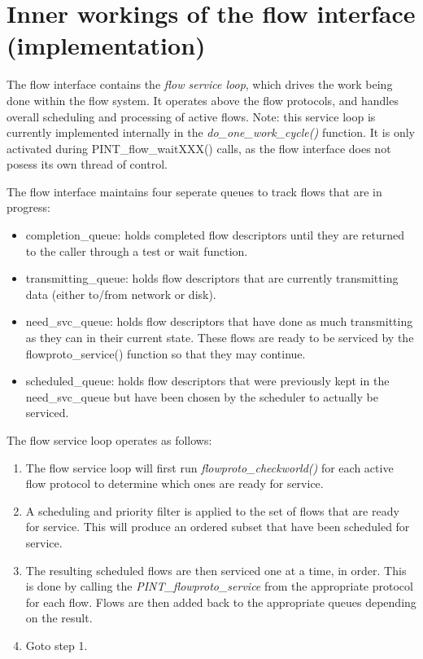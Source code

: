 \documentclass[12pt]{article} %
\begin{document}
\section{Inner workings of the flow interface (implementation)}

The flow interface contains the \emph{flow service loop}, which drives
the work being done within the flow system.  It operates above the flow
protocols, and handles overall scheduling and processing of active flows.
Note: this service loop is currently implemented internally in the
\emph{do\_one\_work\_cycle()} function.  It is only activated
during PINT\_flow\_waitXXX() calls, as the flow interface does not
posess its own thread of control.

The flow interface maintains four seperate queues to track flows
that are in progress:

\begin{itemize}
\item completion\_queue: holds completed flow descriptors until
they are returned to the caller through a test or wait function.
\item transmitting\_queue: holds flow descriptors that are
currently transmitting data (either to/from network or disk).
\item need\_svc\_queue: holds flow descriptors that have done as
much transmitting as they can in their current state.  These flows
are ready to be serviced by the flowproto\_service() function so
that they may continue.
\item scheduled\_queue: holds flow descriptors that were
previously kept in the need\_svc\_queue but have been chosen by
the scheduler to actually be serviced.
\end{itemize}

The flow service loop operates as follows:

\begin{enumerate}
	\item The flow service loop will first run
	\emph{flowproto\_checkworld()} for each active flow protocol to
	determine which ones are ready for service.
	\item A scheduling and priority filter is applied to the set of flows
	that are ready for service.  This will produce an ordered subset that
	have been scheduled for service.
	\item The resulting scheduled flows are then serviced one at a time, in
	order.  This is done by calling the \emph{PINT\_flowproto\_service}
	from the appropriate protocol for each flow.  Flows are then
	added back to the appropriate queues depending on the result.
	\item Goto step 1.
\end{enumerate}
\end{document}
